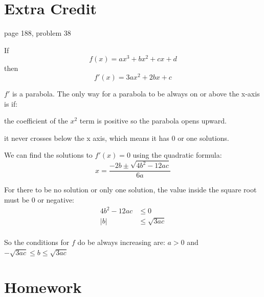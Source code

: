 \documentclass[fleqn]{exam}
\begin{document}
\section{Extra Credit}
page 188, problem 38

\begin{solution}

If 
\[
f(x) = ax^3 + bx^2 + cx + d
\]
then 
\[
  f'(x) = 3ax^2 + 2bx + c
\]

$f'$ is a parabola.  The only way for a parabola to be always on or above the x-axis is if:
\begin{itemize*}
  \item the coefficient of the $x^2$ term is positive so the parabola opens upward.
  \item it never crosses below the x axis, which means it has 0 or one solutions.
\end{itemize*}

We can find the solutions to $f'(x) = 0$ using the quadratic formula:
\[
  x = \frac{-2b \pm \sqrt{4b^2 - 12ac}}{6a}
\]

For there to be no solution or only one solution, the value inside the square root must be 0 or negative:
\begin{align*}
  4b^2 - 12ac &\leq 0 \\
  |b| &\leq \sqrt{3ac} \\
\end{align*}

So the conditions for $f$ do be always increasing are: $a > 0$ and $- \sqrt{3ac} \leq b \leq \sqrt{3ac}$

\end{solution}

\ifprintanswers

\section{Homework}
\end{document}
